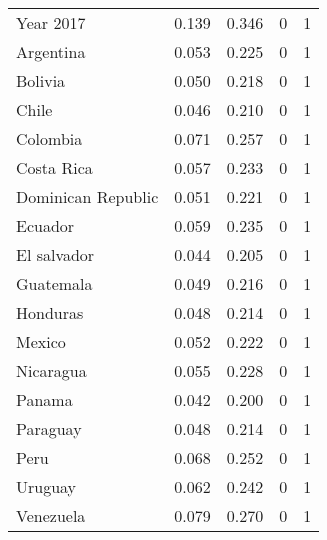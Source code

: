 {\begin{tabularx}{\textwidth}{X D{.}{.}{-3} D{.}{.}{-3} D{.}{.}{-3} D{.}{.}{-3} }
Year 2017 & 0.139 & 0.346 & 0 & 1 \\ 
Argentina & 0.053 & 0.225 & 0 & 1 \\ 
Bolivia & 0.050 & 0.218 & 0 & 1 \\ 
Chile & 0.046 & 0.210 & 0 & 1 \\ 
Colombia & 0.071 & 0.257 & 0 & 1 \\ 
Costa Rica & 0.057 & 0.233 & 0 & 1 \\ 
Dominican Republic & 0.051 & 0.221 & 0 & 1 \\ 
Ecuador & 0.059 & 0.235 & 0 & 1 \\ 
El salvador & 0.044 & 0.205 & 0 & 1 \\ 
Guatemala & 0.049 & 0.216 & 0 & 1 \\ 
Honduras & 0.048 & 0.214 & 0 & 1 \\ 
Mexico & 0.052 & 0.222 & 0 & 1 \\ 
Nicaragua & 0.055 & 0.228 & 0 & 1 \\ 
Panama & 0.042 & 0.200 & 0 & 1 \\ 
Paraguay & 0.048 & 0.214 & 0 & 1 \\ 
Peru & 0.068 & 0.252 & 0 & 1 \\ 
Uruguay & 0.062 & 0.242 & 0 & 1 \\ 
Venezuela & 0.079 & 0.270 & 0 & 1 \\ 
\bottomrule 
\end{tabularx} 
}
